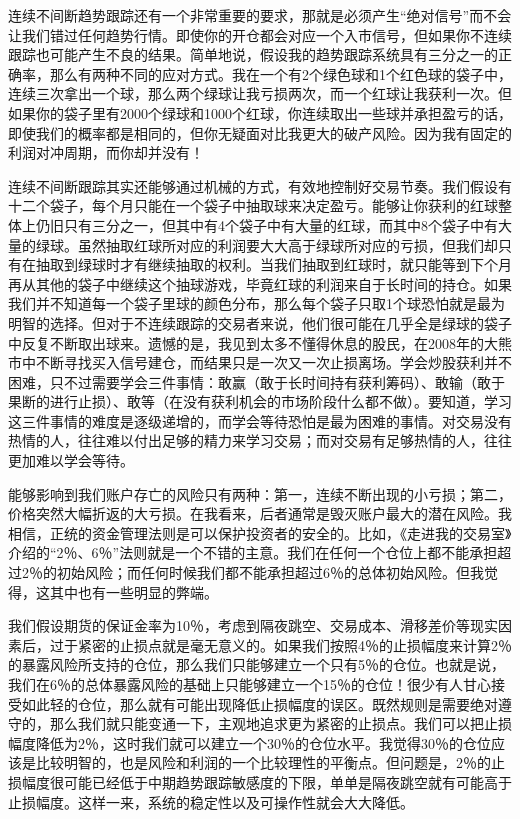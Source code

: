 连续不间断趋势跟踪还有一个非常重要的要求，那就是必须产生“绝对信号”而不会让我们错过任何趋势行情。即使你的开仓都会对应一个入市信号，但如果你不连续跟踪也可能产生不良的结果。简单地说，假设我的趋势跟踪系统具有三分之一的正确率，那么有两种不同的应对方式。我在一个有2个绿色球和1个红色球的袋子中，连续三次拿出一个球，那么两个绿球让我亏损两次，而一个红球让我获利一次。但如果你的袋子里有2000个绿球和1000个红球，你连续取出一些球并承担盈亏的话，即使我们的概率都是相同的，但你无疑面对比我更大的破产风险。因为我有固定的利润对冲周期，而你却并没有！

连续不间断跟踪其实还能够通过机械的方式，有效地控制好交易节奏。我们假设有十二个袋子，每个月只能在一个袋子中抽取球来决定盈亏。能够让你获利的红球整体上仍旧只有三分之一，但其中有4个袋子中有大量的红球，而其中8个袋子中有大量的绿球。虽然抽取红球所对应的利润要大大高于绿球所对应的亏损，但我们却只有在抽取到绿球时才有继续抽取的权利。当我们抽取到红球时，就只能等到下个月再从其他的袋子中继续这个抽球游戏，毕竟红球的利润来自于长时间的持仓。如果我们并不知道每一个袋子里球的颜色分布，那么每个袋子只取1个球恐怕就是最为明智的选择。但对于不连续跟踪的交易者来说，他们很可能在几乎全是绿球的袋子中反复不断取出球来。遗憾的是，我见到太多不懂得休息的股民，在2008年的大熊市中不断寻找买入信号建仓，而结果只是一次又一次止损离场。学会炒股获利并不困难，只不过需要学会三件事情：敢赢（敢于长时间持有获利筹码）、敢输（敢于果断的进行止损）、敢等（在没有获利机会的市场阶段什么都不做）。要知道，学习这三件事情的难度是逐级递增的，而学会等待恐怕是最为困难的事情。对交易没有热情的人，往往难以付出足够的精力来学习交易；而对交易有足够热情的人，往往更加难以学会等待。

能够影响到我们账户存亡的风险只有两种：第一，连续不断出现的小亏损；第二，价格突然大幅折返的大亏损。在我看来，后者通常是毁灭账户最大的潜在风险。我相信，正统的资金管理法则是可以保护投资者的安全的。比如，《走进我的交易室》介绍的“2％、6％”法则就是一个不错的主意。我们在任何一个仓位上都不能承担超过2％的初始风险；而任何时候我们都不能承担超过6％的总体初始风险。但我觉得，这其中也有一些明显的弊端。

我们假设期货的保证金率为10％，考虑到隔夜跳空、交易成本、滑移差价等现实因素后，过于紧密的止损点就是毫无意义的。如果我们按照4％的止损幅度来计算2％的暴露风险所支持的仓位，那么我们只能够建立一个只有5％的仓位。也就是说，我们在6％的总体暴露风险的基础上只能够建立一个15％的仓位！很少有人甘心接受如此轻的仓位，那么就有可能出现降低止损幅度的误区。既然规则是需要绝对遵守的，那么我们就只能变通一下，主观地追求更为紧密的止损点。我们可以把止损幅度降低为2％，这时我们就可以建立一个30％的仓位水平。我觉得30％的仓位应该是比较明智的，也是风险和利润的一个比较理性的平衡点。但问题是，2％的止损幅度很可能已经低于中期趋势跟踪敏感度的下限，单单是隔夜跳空就有可能高于止损幅度。这样一来，系统的稳定性以及可操作性就会大大降低。

